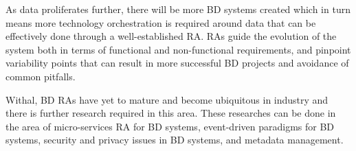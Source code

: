 \documentclass[review]{elsarticle}
\begin{document}
As data proliferates further, there will be more BD systems created which in turn means more technology orchestration is required around data that can be effectively done through a well-established RA. RAs guide the evolution of the system both in terms of functional and non-functional requirements, and pinpoint variability points that can result in more successful BD projects and avoidance of common pitfalls. 

Withal, BD RAs have yet to mature and become ubiquitous in industry and there is further research required in this area. These researches can be done in the area of micro-services RA for BD systems, event-driven paradigms for BD systems, security and privacy issues in BD systems, and metadata management.


\end{document}

